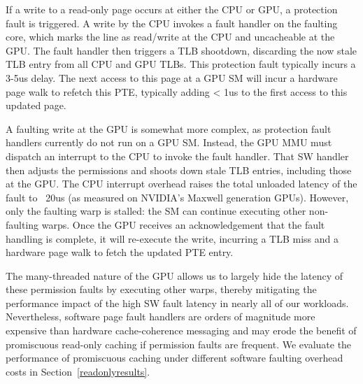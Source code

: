 If a write to a read-only page occurs at either the CPU or GPU, a protection
fault is triggered. A write by the CPU invokes a fault handler
on the faulting core, which marks the line as read/write at the CPU and
uncacheable at the GPU.  The fault handler then triggers a TLB shootdown,
discarding the now stale TLB entry from all CPU and GPU TLBs.
This protection fault typically incurs a 3-5us delay.  The next access
to this page at a GPU SM will incur a hardware page walk to refetch this PTE, 
typically adding < 1us to the first access to this updated page.

A faulting write at the GPU is somewhat more complex, as protection fault
handlers currently do not run on a GPU SM.  Instead, the GPU MMU must
dispatch an interrupt to the CPU to invoke the fault handler.  That SW handler
then adjusts the permissions and shoots down stale TLB entries, including those at the GPU.
The CPU interrupt overhead raises the total unloaded latency of the fault to ~20us (as measured
on NVIDIA's Maxwell generation GPUs). However, only the faulting warp is stalled: the SM can
continue executing other non-faulting warps.  Once the GPU receives an acknowledgement that the
fault handling is complete, it will re-execute the write, incurring a TLB miss
and a hardware page walk to fetch the updated PTE entry.

The many-threaded nature of the GPU allows us to largely hide 
the latency of these permission faults by executing other warps, thereby mitigating 
the performance impact of the high SW fault latency in nearly all of our workloads.
Nevertheless, software page fault handlers are orders of magnitude more expensive
than hardware cache-coherence messaging and may erode the benefit of promiscuous 
read-only caching if permission faults are frequent.  We evaluate the performance of promiscuous 
caching under different software faulting overhead costs in Section~\ref{readonlyresults}.
